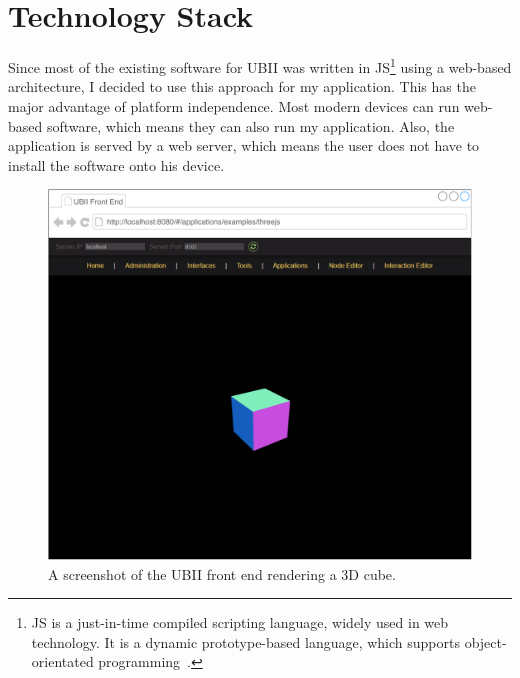 \section{Technology Stack}\label{section:technology-stack}

Since most of the existing software for \ac{UBII} was written in \acf{JS}\footnote{\ac{JS} is a just-in-time compiled scripting language, widely used in web technology. It is a dynamic prototype-based language, which supports object-orientated programming~\cite[43, 47]{ECMAInternational.2018}.} using a web-based architecture, I decided to use this approach for my application. This has the major advantage of platform independence. Most modern devices can run web-based software, which means they can also run my application. Also, the application is served by a web server, which means the user does not have to install the software onto his device.

\begin{figure}[htpb]
  \centering
  \includegraphics[width=12cm]{figures/ubii_front_end.pdf}
  \caption[Screenshot of the UBII front end]{A screenshot of the UBII front end rendering a 3D cube.}\label{fig:ubii-front-end}
\end{figure}

